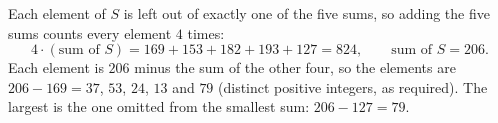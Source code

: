 Each element of $S$ is left out of exactly one of the five sums, so adding the five sums counts every element $4$ times:
\[
4\cdot(\text{sum of }S)=169+153+182+193+127=824,\qquad\text{sum of }S=206 .
\]
Each element is $206$ minus the sum of the other four, so the elements are $206-169=37$, $53$, $24$, $13$ and $79$ (distinct positive integers, as required). The largest is the one omitted from the smallest sum: $206-127=\boxed{79}$.
